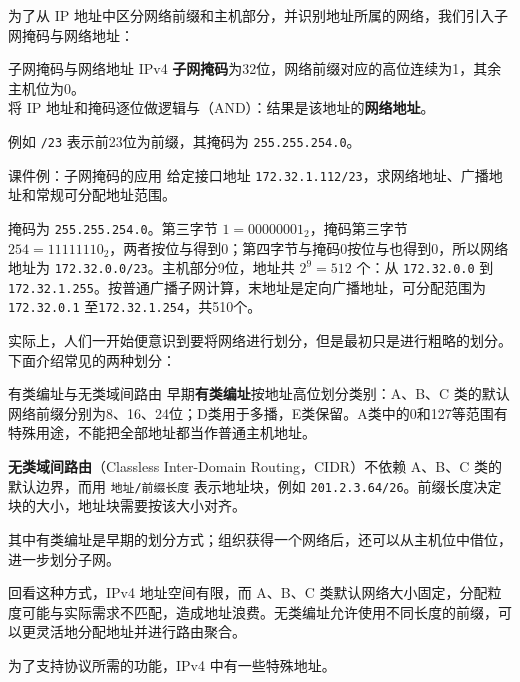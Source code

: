 为了从 IP 地址中区分网络前缀和主机部分，并识别地址所属的网络，我们引入子网掩码与网络地址：

\begin{definition}{子网掩码与网络地址}
IPv4 \textbf{子网掩码}为32位，网络前缀对应的高位连续为1，其余主机位为0。\\
将 IP 地址和掩码逐位做逻辑与（AND）：结果是该地址的\textbf{网络地址}。
\end{definition}

例如 \texttt{/23} 表示前23位为前缀，其掩码为 \texttt{255.255.254.0}。

\begin{example}{课件例：子网掩码的应用}
给定接口地址 \texttt{172.32.1.112/23}，求网络地址、广播地址和常规可分配地址范围。
\end{example}
\begin{solution}
\begin{sloppypar}
掩码为 \texttt{255.255.254.0}。第三字节 $1=00000001_2$，掩码第三字节 $254=11111110_2$，两者按位与得到0；第四字节与掩码0按位与也得到0，所以网络地址为 \texttt{172.32.0.0/23}。主机部分9位，地址共 $2^9=512$ 个：从 \texttt{172.32.0.0} 到 \texttt{172.32.1.255}。按普通广播子网计算，末地址是定向广播地址，可分配范围为 \texttt{172.32.0.1} 至\allowbreak \texttt{172.32.1.254}，共510个。
\end{sloppypar}
\end{solution}

实际上，人们一开始便意识到要将网络进行划分，但是最初只是进行粗略的划分。下面介绍常见的两种划分：

\begin{definition}{有类编址与无类域间路由}
早期\textbf{有类编址}按地址高位划分类别：A、B、C 类的默认网络前缀分别为8、16、24位；D类用于多播，E类保留。A类中的0和127等范围有特殊用途，不能把全部地址都当作普通主机地址。

\textbf{无类域间路由}（Classless Inter-Domain Routing，CIDR）不依赖 A、B、C 类的默认边界，而用 \texttt{地址/前缀长度} 表示地址块，例如 \texttt{201.2.3.64/26}。前缀长度决定块的大小，地址块需要按该大小对齐。
\end{definition}

其中有类编址是早期的划分方式；组织获得一个网络后，还可以从主机位中借位，进一步划分子网。

回看这种方式，IPv4 地址空间有限，而 A、B、C 类默认网络大小固定，分配粒度可能与实际需求不匹配，造成地址浪费。无类编址允许使用不同长度的前缀，可以更灵活地分配地址并进行路由聚合。

为了支持协议所需的功能，IPv4 中有一些特殊地址。

